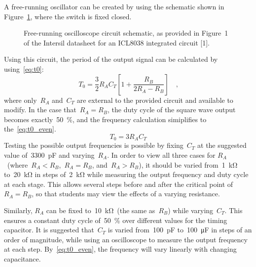 A free-running oscillator can be created by using the schematic shown in
Figure~\ref{fig:free_run}, where the switch is fixed closed.
%
\begin{figure}[H]
	\centering
	
	\parbox{.6\textwidth}{
	\caption{Free-running oscilloscope circuit schematic, as provided in Figure~1 of the
	Intersil datasheet for an ICL8038 integrated circuit [1].}
	\label{fig:free_run}}
\end{figure}
%
Using this circuit, the period of the output signal can be calculated by using~\eqref{eq:t0}:
%
\begin{equation}
	T_0 = \frac{3}{2} R_A C_T \left[ 1 + \frac{R_B}{2R_A - R_B} \right] \quad \text{,}
	\label{eq:t0}
\end{equation}
%
where only~$R_A$ and~$C_T$ are external to the provided circuit and available
to modify.  In the case that~$R_A = R_B$, the duty cycle of the square wave
output becomes exactly~\SI{50}{\percent}, and the frequency calculation
simiplifies to the~\eqref{eq:t0_even}.
%
\begin{equation}
	T_0 = 3 R_A C_T
	\label{eq:t0_even}
\end{equation}
%
Testing the possible output frequencies is possible by fixing~$C_T$ at the
suggested value of~\SI{3300}{\pico\farad} and varying~$R_A$.  In order to view
all three cases for $R_A$~(where~$R_A < R_B$,~$R_A = R_B$, and~$R_A > R_B$), it
should be varied from~\SI{1}{\kilo\ohm} to~\SI{20}{\kilo\ohm} in steps
of~\SI{2}{\kilo\ohm} while measuring the output frequency and duty cycle at
each stage.  This allows several steps before and after the critical point
of~$R_A = R_B$, so that students may view the effects of a varying resistance.

Similarly, $R_A$ can be fixed to~\SI{10}{\kilo\ohm}~(the same as~$R_B$) while
varying~$C_T$.  This ensures a constant duty cycle of~\SI{50}{\percent} over
different values for the timing capacitor.  It is suggested that~$C_T$ is
varied from~\SI{100}{\pico\farad} to~\SI{100}{\micro\farad} in steps of an
order of magnitude, while using an oscilloscope to measure the output frequency
at each step.  By~\eqref{eq:t0_even}, the frequency will vary linearly with
changing capacitance.

\begin{figure}[H]
	\centering
	
\end{figure}


